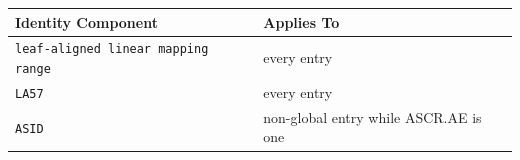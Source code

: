 \Needspace{1.25in}
\begingroup\footnotesize
\setlength{\aboverulesep}{0pt}
\setlength{\belowrulesep}{0pt}
\setlength{\extrarowheight}{1.2pt}
\begin{center}
\begin{tabularx}{\linewidth}{@{}>{\raggedright\arraybackslash}p{2.00in}>{\raggedright\arraybackslash}X@{}}
\toprule
\rowcolor{ManualHeaderFill}
\textbf{Identity Component} & \textbf{Applies To}\\
\midrule
\texttt{leaf-aligned linear mapping range} & every entry\\
\texttt{LA57} & every entry\\
\texttt{ASID} & non-global entry while ASCR.AE is one\\
\bottomrule
\end{tabularx}
\end{center}
\endgroup


